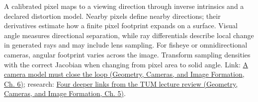 A calibrated pixel maps to a viewing direction through inverse intrinsics and a declared distortion model. Nearby pixels define nearby directions; their derivatives estimate how a finite pixel footprint expands on a surface. Visual angle measures directional separation, while ray differentials describe local change in generated rays and may include lens sampling. For fisheye or omnidirectional cameras, angular footprint varies across the image. Transform sampling densities with the correct Jacobian when changing from pixel area to solid angle. Link: \href{../03-Geometry-Cameras-and-Image-Formation/main.pdf\#nameddest=02-foundations-ii-ch037-a-camera-model-must-close-the-loop}{A camera model must close the loop (Geometry, Cameras, and Image Formation, Ch. 6)}; research: \href{../03-Geometry-Cameras-and-Image-Formation/main.pdf\#nameddest=02-foundations-ii-ch036-four-deeper-links-from-the-tum-lecture-review}{Four deeper links from the TUM lecture review (Geometry, Cameras, and Image Formation, Ch. 5)}.
